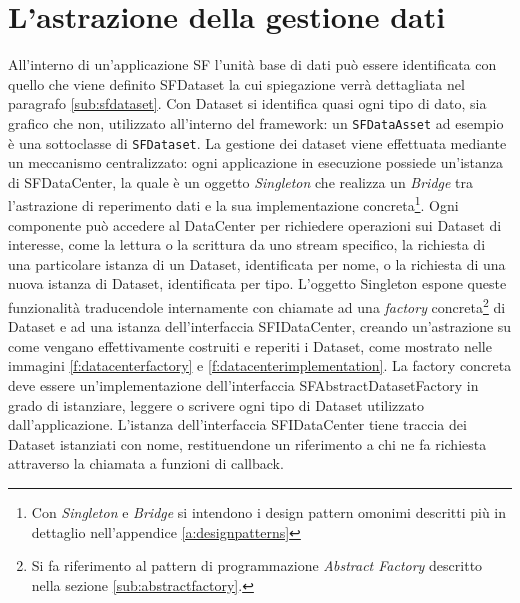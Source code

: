\section{L'astrazione della gestione dati}
\label{sec:astrazione}
All'interno di un'applicazione \ac{SF} l'unit\`a base di dati pu\`o essere identificata con quello che viene definito SFDataset la cui spiegazione verr\`a dettagliata nel paragrafo \ref{sub:sfdataset}. Con Dataset si identifica quasi ogni tipo di dato, sia grafico che non, utilizzato all'interno del framework: un \texttt{SFDataAsset} ad esempio \`e una sottoclasse di \texttt{SFDataset}.
La gestione dei dataset viene effettuata mediante un meccanismo centralizzato: ogni applicazione in esecuzione possiede un'istanza di SFDataCenter, la quale \`e un oggetto \textit{Singleton} che realizza un \textit{Bridge}
tra l'astrazione di reperimento dati e la sua implementazione concreta\footnote{Con \textit{Singleton} e \textit{Bridge} si intendono i design pattern omonimi descritti pi\`u in dettaglio nell'appendice \ref{a:designpatterns}}.
Ogni componente pu\`o accedere al DataCenter per richiedere operazioni sui Dataset di interesse, come la lettura o la scrittura da uno stream specifico, la richiesta di una particolare istanza di un Dataset, identificata per nome, o la richiesta di una nuova istanza di Dataset, identificata per tipo.
L'oggetto Singleton espone queste funzionalit\`a traducendole internamente con chiamate ad una \textit{factory} concreta\footnote{Si fa riferimento al pattern di programmazione \textit{Abstract Factory} descritto nella sezione \ref{sub:abstractfactory}.}
di Dataset e ad una istanza dell'interfaccia SFIDataCenter, creando un'astrazione su come vengano effettivamente costruiti e reperiti i Dataset, come mostrato nelle immagini \ref{f:datacenterfactory} e \ref{f:datacenterimplementation}.
La factory concreta deve essere un'implementazione dell'interfaccia SFAbstractDatasetFactory in grado di istanziare, leggere o scrivere ogni tipo di Dataset utilizzato dall'applicazione.
L'istanza dell'interfaccia SFIDataCenter tiene traccia dei Dataset istanziati con nome, restituendone un riferimento a chi ne fa richiesta attraverso la chiamata a funzioni di callback.

